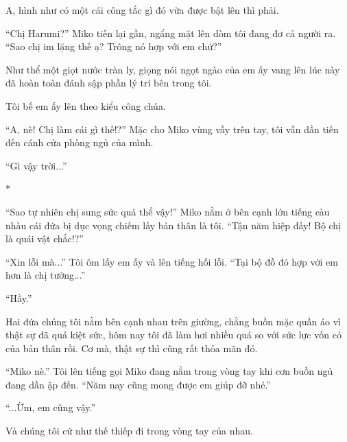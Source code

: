 {A, hình như có một cái công tắc gì đó vừa được bật lên thì phải.

``Chị Harumi?'' Miko tiến lại gần, ngẩng mặt lên dòm tôi đang đơ cả
người ra. ``Sao chị im lặng thế ạ? Trông nó hợp với em chứ?''

Như thể một giọt nước tràn ly, giọng nói ngọt ngào của em ấy vang lên
lúc này đã hoàn toàn đánh sập phần lý trí bên trong tôi.

Tôi bế em ấy lên theo kiểu công chúa.

``A, nè! Chị làm cái gì thế!?'' Mặc cho Miko vùng vẫy trên tay, tôi vẫn
dần tiến đến cánh cửa phòng ngủ của mình.

``Gì vậy trời...''

*

``Sao tự nhiên chị sung sức quá thể vậy!'' Miko nằm ở bên cạnh lớn tiếng
càu nhàu cái đứa bị dục vọng chiếm lấy bản thân là tôi. ``Tận năm hiệp
đấy! Bộ chị là quái vật chắc!?''

``Xin lỗi mà...'' Tôi ôm lấy em ấy và lên tiếng hối lỗi. ``Tại bộ đồ đó
hợp với em hơn là chị tưởng...''

``Hầy.''

Hai đứa chúng tôi nằm bên cạnh nhau trên giường, chẳng buồn mặc quần áo
vì thật sự đã quá kiệt sức, hôm nay tôi đã làm hơi nhiều quá so với sức
lực vốn có của bản thân rồi. Cơ mà, thật sự thì cũng rất thỏa mãn đó.

``Miko nè.'' Tôi lên tiếng gọi Miko đang nằm trong vòng tay khi cơn buồn
ngủ đang dần ập đến. ``Năm nay cũng mong được em giúp đỡ nhé.''

``...Ừm, em cũng vậy.''

Và chúng tôi cứ như thế thiếp đi trong vòng tay của nhau.

}